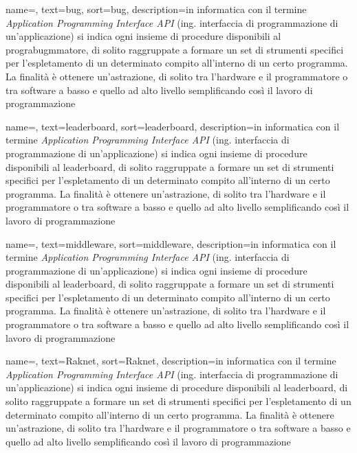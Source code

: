 {
	name=,
	text=bug,
	sort=bug,
	description={in informatica con il termine \emph{Application Programming Interface API} (ing. interfaccia di programmazione di un'applicazione) si indica ogni insieme di procedure disponibili al prograbugmmatore, di solito raggruppate a formare un set di strumenti specifici per l'espletamento di un determinato compito all'interno di un certo programma. La finalità è ottenere un'astrazione, di solito tra l'hardware e il programmatore o tra software a basso e quello ad alto livello semplificando così il lavoro di programmazione}
}

{
	name=,
	text=leaderboard,
	sort=leaderboard,
	description={in informatica con il termine \emph{Application Programming Interface API} (ing. interfaccia di programmazione di un'applicazione) si indica ogni insieme di procedure disponibili al leaderboard, di solito raggruppate a formare un set di strumenti specifici per l'espletamento di un determinato compito all'interno di un certo programma. La finalità è ottenere un'astrazione, di solito tra l'hardware e il programmatore o tra software a basso e quello ad alto livello semplificando così il lavoro di programmazione}
}

{
	name=,
	text=middleware,
	sort=middleware,
	description={in informatica con il termine \emph{Application Programming Interface API} (ing. interfaccia di programmazione di un'applicazione) si indica ogni insieme di procedure disponibili al leaderboard, di solito raggruppate a formare un set di strumenti specifici per l'espletamento di un determinato compito all'interno di un certo programma. La finalità è ottenere un'astrazione, di solito tra l'hardware e il programmatore o tra software a basso e quello ad alto livello semplificando così il lavoro di programmazione}
}

{
	name=,
	text=Raknet,
	sort=Raknet,
	description={in informatica con il termine \emph{Application Programming Interface API} (ing. interfaccia di programmazione di un'applicazione) si indica ogni insieme di procedure disponibili al leaderboard, di solito raggruppate a formare un set di strumenti specifici per l'espletamento di un determinato compito all'interno di un certo programma. La finalità è ottenere un'astrazione, di solito tra l'hardware e il programmatore o tra software a basso e quello ad alto livello semplificando così il lavoro di programmazione}
}

